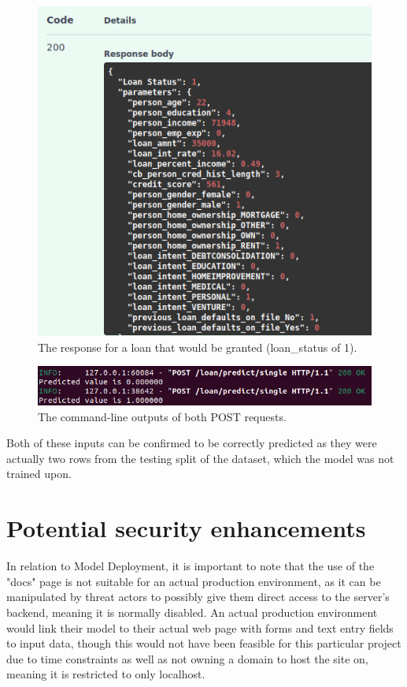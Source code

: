 \documentclass[12pt]{report}
\newcommand{\para}{\vspace{7pt}\noindent}
\begin{document}
\begin{figure}[H]
    \centering
    \includegraphics[width=\linewidth]{Implementation/FastAPI+Uvi/TruePositive.png}
    \caption{The response for a loan that would be granted (loan\_status of 1).}
    \label{fig:UviTruePositive}
\end{figure}

\begin{figure}[H]
    \centering
    \includegraphics[width=\linewidth]{Implementation/FastAPI+Uvi/TruePredictionsCLI.png}
    \caption{The command-line outputs of both POST requests.}
    \label{fig:UviCLI}
\end{figure}

\para Both of these inputs can be confirmed to be correctly predicted as they were actually two 
rows from the testing split of the dataset, which the model was not trained upon.

\section{Potential security enhancements}\label{sec:SecurityEnhancements}
In relation to Model Deployment, it is important to note that the use of the "docs" page is not suitable for an actual production 
environment, as it can be manipulated by threat actors to possibly give them direct access to the 
server's backend, meaning it is normally disabled. An actual production environment would link their 
model to their actual web page with forms and text entry fields to input data, though this would not 
have been feasible for this particular project due to time constraints as well as not owning a domain 
to host the site on, meaning it is restricted to only localhost.
\end{document}
